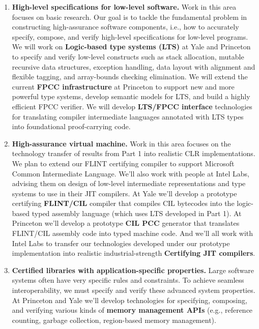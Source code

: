 {\renewcommand{\labelenumi}{\bf\theenumi.}
\begin{enumerate} \itemsep 0pt
\item {\bf High-level specifications for low-level software.} 
Work in this area focuses on basic research. Our goal is to tackle the
fundamental problem in constructing high-assurance software
components, i.e., how to accurately specify, compose, and verify
high-level specifications for low-level programs.
We will work on {\bf{}Logic-based type systems (LTS)} at Yale and Princeton
to specify and verify low-level 
      constructs such as stack allocation, mutable recursive
      data structures, exception handling, data layout 
      with alignment and flexible tagging, 
      and array-bounds checking elimination.
We will extend the current {\bf{}FPCC infrastructure} at Princeton
 to support new and more
      powerful type systems, develop semantic models for LTS, and build a
      highly efficient FPCC verifier.
We will develop 
{\bf{}LTS/FPCC interface}
technologies for translating compiler intermediate languages
annotated with LTS types into foundational proof-carrying code.

\item{\bf High-assurance virtual machine.}
Work in this area focuses on the technology transfer of results from
Part 1 into realistic CLR implementations. We plan to extend our
FLINT certifying compiler to support Microsoft Common Intermediate 
Language. We'll also work with people at Intel Labs, 
advising them on design of low-level intermediate representations 
and type systems to use in their JIT compilers.  
%
At Yale we'll develop a prototype 
certifying {\bf FLINT/CIL} compiler that compiles CIL bytecodes into the
      logic-based typed assembly language (which uses LTS developed in
      Part 1).  
At Princeton we'll 
      develop a prototype {\bf CIL PCC} generator that translates FLINT/CIL 
      assembly code into typed machine code. 
And we'll all work with Intel Labs
      to transfer our technologies developed under our prototype
      implementation into realistic industrial-strength 
{\bf Certifying JIT compilers}. 
%
\item{\bf Certified libraries with application-specific 
           properties.}
Large software systems often have very specific rules and constraints. 
To achieve seamless interoperability, we must specify
and verify these advanced system properties. 
At Princeton and Yale we'll
      develop technologies for specifying, composing, and
      verifying various kinds of {\bf{}memory management APIs}  
      (e.g., 
      reference counting, garbage collection, region-based memory  
      management).
%
\end{enumerate}}
